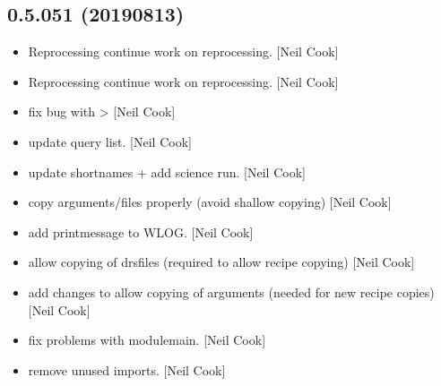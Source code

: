 \documentclass[a4paper,10pt,english]{report}
\begin{document}
\subsection{0.5.051 (2019\sphinxhyphen{}08\sphinxhyphen{}13)}
\label{\detokenize{misc/changelog:id110}}\begin{itemize}
\item {} 
Reprocessing \sphinxhyphen{} continue work on reprocessing. {[}Neil Cook{]}

\item {} 
Reprocessing \sphinxhyphen{} continue work on reprocessing. {[}Neil Cook{]}

\item {} 
 \sphinxhyphen{} fix bug with 
\textendash{}\textgreater{}  {[}Neil Cook{]}

\item {} 
 \sphinxhyphen{} update query list. {[}Neil Cook{]}

\item {} 
 \sphinxhyphen{} update shortnames +
add science run. {[}Neil Cook{]}

\item {} 
 \sphinxhyphen{} copy arguments/files properly (avoid shallow
copying) {[}Neil Cook{]}

\item {} 
 \sphinxhyphen{} add printmessage to WLOG. {[}Neil Cook{]}

\item {} 
 \sphinxhyphen{} allow copying of drsfiles (required to allow
recipe copying) {[}Neil Cook{]}

\item {} 
 \sphinxhyphen{} add changes to allow copying of arguments
(needed for new recipe copies) {[}Neil Cook{]}

\item {} 
 \sphinxhyphen{} fix problems with modulemain. {[}Neil Cook{]}

\item {} 
 \sphinxhyphen{} remove unused imports. {[}Neil Cook{]}


\end{itemize}
\end{document}
